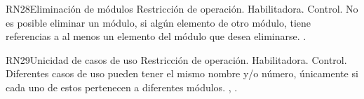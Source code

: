 \begin{BussinesRule}{RN28}{Eliminación de módulos} 
	\BRitem[Tipo:] Restricción de operación. 
	\BRitem[Clase:] Habilitadora. 
	\BRitem[Nivel:] Control. %
	\BRitem[Descripción:] No es posible eliminar un módulo, si algún elemento de otro módulo, tiene referencias a al menos un elemento del módulo que desea eliminarse.
	 . 
\end{BussinesRule}

\begin{BussinesRule}{RN29}{Unicidad de casos de uso} 
	\BRitem[Tipo:] Restricción de operación. 
	\BRitem[Clase:] Habilitadora. 
	\BRitem[Nivel:] Control. %
	\BRitem[Descripción:] Diferentes casos de uso pueden tener el mismo nombre y/o número, únicamente si cada uno de estos pertenecen a diferentes módulos.
	 , . 
\end{BussinesRule}


